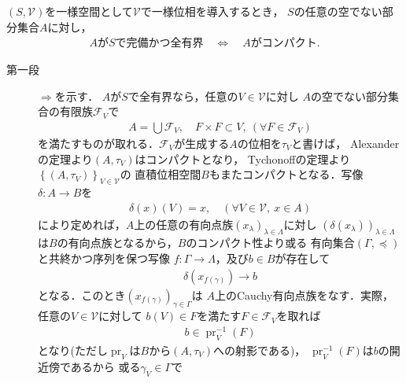 	\begin{screen}
		\begin{thm}
			$(S,\mathscr{V})$を一様空間として$\mathscr{V}$で一様位相を導入するとき，
			$S$の任意の空でない部分集合$A$に対し，
			\begin{align}
				\mbox{$A$が$S$で完備かつ全有界} \quad \Longleftrightarrow \quad
				\mbox{$A$がコンパクト}.
			\end{align}
		\end{thm}
	\end{screen}
	
	\begin{prf}\mbox{}
		\begin{description}
			\item[第一段]
				$\Longrightarrow$を示す．
				$A$が$S$で全有界なら，任意の$V \in \mathscr{V}$に対し
				$A$の空でない部分集合の有限族$\mathscr{F}_V$で
				\begin{align}
					A = \bigcup \mathscr{F}_V,\quad
					F \times F \subset V,\ (\forall F \in \mathscr{F}_V)
				\end{align}
				を満たすものが取れる．$\mathscr{F}_V$が生成する$A$の位相を$\tau_V$と書けば，
				Alexanderの定理より$(A,\tau_V)$はコンパクトとなり，
				Tychonoffの定理より$\left\{(A,\tau_V)\right\}_{V \in \mathscr{V}}$の
				直積位相空間$B$もまたコンパクトとなる．写像$\delta:A \longrightarrow B$を
				\begin{align}
					\delta(x)(V) = x,\quad (\forall V \in \mathscr{V},\ x \in A)
				\end{align}
				により定めれば，$A$上の任意の有向点族$(x_\lambda)_{\lambda \in \Lambda}$に対し
				$\left(\delta(x_\lambda)\right)_{\lambda \in \Lambda}$
				は$B$の有向点族となるから，$B$のコンパクト性より或る
				有向集合$(\Gamma,\preceq)$と共終かつ序列を保つ写像
				$f:\Gamma \longrightarrow \Lambda$，及び$b \in B$が存在して
				\begin{align}
					\delta(x_{f(\gamma)}) \longrightarrow b
				\end{align}
				となる．このとき$(x_{f(\gamma)})_{\gamma \in \Gamma}$は
				$A$上のCauchy有向点族をなす．実際，任意の$V \in \mathscr{V}$に対して
				$b(V) \in F$を満たす$F \in \mathscr{F}_V$を取れば
				\begin{align}
					b \in \operatorname{pr}_V^{-1}(F)
				\end{align}
				となり(ただし$\operatorname{pr}_V$は$B$から$(A,\tau_V)$への射影である)，
				$\operatorname{pr}_V^{-1}(F)$は$b$の開近傍であるから
				或る$\gamma_V \in \Gamma$で

\end{description}
\end{prf}
